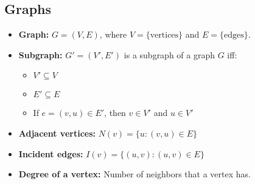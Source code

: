 \subsection{Graphs}
    \begin{definition}
        \begin{itemize}
            \item \textbf{Graph:} $G = (V, E)$, where $V = \{\text{vertices}\}$ and $E = \{\text{edges}\}$.
            \item \textbf{Subgraph:} $G' = (V', E')$ is a subgraph of a graph $G$ iff:
            \begin{itemize}
                \item $V' \subseteq V$
                \item $E' \subseteq E$
                \item If $e = (v, u) \in E'$, then $v \in V'$ and $u \in V'$
            \end{itemize}
            \item \textbf{Adjacent vertices:} $N(v) = \{u : (v, u) \in E\}$
            \item \textbf{Incident edges:} $I(v) = \{(u, v) : (u, v) \in E\}$
            \item \textbf{Degree of a vertex:} Number of neighbors that a vertex has.
        \end{itemize}            
    \end{definition}

